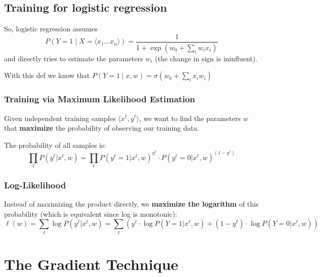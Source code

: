 \subsection{Training for logistic regression}
So, logistic regression assumes
\[
 P(Y=1\mid X =\langle x_1 \dots x_n\rangle) =\frac{1}{1+\exp{(w_0+\sum_iw_ix_i)}}
\]
and directly tries to estimate the parameters $w_i$ (the change in sign
is ininfluent).


With this def we know that $P(Y=1\mid x, w) = \sigma (w_0 + \sum_{i}x_iw_i)$

\subsubsection{Training via Maximum Likelihood Estimation}

Given independent training samples $\langle x^\ell, y^\ell \rangle$, we want to find the parameters $w$ that \textbf{maximize} the probability of observing our training data.

The probability of all samples is:
\[
\prod_\ell P(y^\ell | x^\ell, w) = \prod_\ell P(y^\ell = 1|x^\ell, w)^{y^\ell} \cdot P(y^\ell = 0|x^\ell, w)^{(1-y^\ell)}
\]


\subsubsection{Log-Likelihood}

Instead of maximizing the product directly, we \textbf{maximize the logarithm} of this probability (which is equivalent since log is monotonic):
\[
\ell(w) = \sum_\ell \log P(y^\ell | x^\ell, w) = \sum_\ell \left( y^\ell \cdot \log P(Y=1|x^\ell, w) + (1-y^\ell) \cdot \log P(Y=0|x^\ell, w) \right)
\]

\section{The Gradient Technique}

